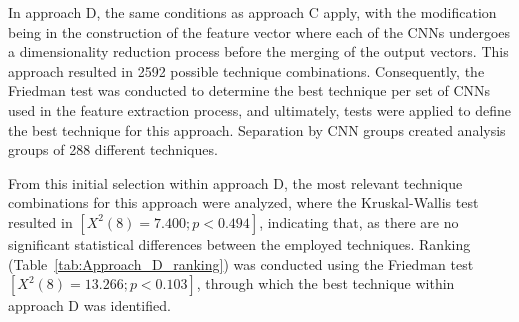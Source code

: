 \documentclass[preprint,12pt]{elsarticle}
\begin{document}
In approach D, the same conditions as approach C apply, with the modification being in the construction of the feature vector where each of the CNNs undergoes a dimensionality reduction process before the merging of the output vectors. This approach resulted in 2592 possible technique combinations. Consequently, the Friedman test was conducted to determine the best technique per set of CNNs used in the feature extraction process, and ultimately, tests were applied to define the best technique for this approach. Separation by CNN groups created analysis groups of 288 different techniques.

From this initial selection within approach D, the most relevant technique combinations for this approach were analyzed, where the Kruskal-Wallis test resulted in $[X^2(8)=7.400; p<0.494]$,  indicating that, as there are no significant statistical differences between the employed techniques. Ranking (Table~\ref{tab:Approach_D_ranking}) was conducted using the Friedman test $[X^2(8)=13.266; p<0.103]$, through which the best technique within approach D was identified.
\end{document}
